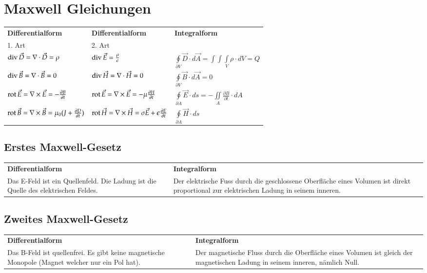 \section{Maxwell Gleichungen}
\begin{longtable}{|p{} |p{}|p{}| }
	\hline
	\textbf{Differentialform} &\textbf{Differentialform} &\textbf{Integralform}\\
	1. Art & 2. Art &\\
	\hline
	$\operatorname{div} \vec{D}=\nabla \cdot \vec{D}= \rho$ & $\operatorname{div} \vec{E}= \frac{\rho}{\epsilon}$&$\oint\limits_{\partial V}\vec{D}\cdot d\vec{A}=\int\int\int\limits_{V}\rho \cdot dV=Q$\\
	\hline
	$\operatorname{div} \vec{B}=\nabla \cdot \vec{B}=0$&$\operatorname{div} \vec{H}=\nabla \cdot \vec{H}=0 $&$\oint\limits_{\partial V}\vec{B}\cdot d\vec{A}=0$\\
	\hline
	$\operatorname{rot} \vec{E}=\nabla \times \vec{E}=-\frac{\partial B}{\partial t}$&$\operatorname{rot} \vec{E}=\nabla \times \vec{E}=-\mu \frac{\partial H}{\partial t}$&$\oint\limits_{\partial A}\vec{E}\cdot ds=-\iint\limits_{A}\frac{\partial B}{\partial t}\cdot dA$\\
	\hline
	$\operatorname{rot}\vec{B}=\nabla\times\vec{B}=\mu_0 (J+\frac{\partial D}{\partial t})$&$\operatorname{rot} \vec{H}=\nabla \times \vec{H}=\sigma\vec{E}+\epsilon \frac{\partial E}{\partial t}$&$\oint\limits_{\partial A} \vec{H}\cdot ds$\\
	\hline
\end{longtable}
\subsection{Erstes Maxwell-Gesetz}
\begin{tabular}{p{} p{}}
	\textbf{Differentialform}&\textbf{Integralform}\\
	Das E-Feld ist ein Quellenfeld. Die Ladung ist die Quelle des elektrischen Feldes. & Der elektrische Fuss durch die geschlossene Oberfläche eines Volumen ist direkt proportional zur elektrischen Ladung in seinem inneren. \\
\end{tabular}
\subsection{Zweites Maxwell-Gesetz}
\begin{tabular}{p{} p{}}
	\textbf{Differentialform}&\textbf{Integralform}\\
	Das B-Feld ist quellenfrei. Es gibt keine magnetische Monopole (Magnet welcher nur ein Pol hat).& Der magnetische Fluss durch die Oberfläche eines Volumen ist gleich der magnetischen Ladung in seinem inneren, nämlich Null.\\
\end{tabular}
